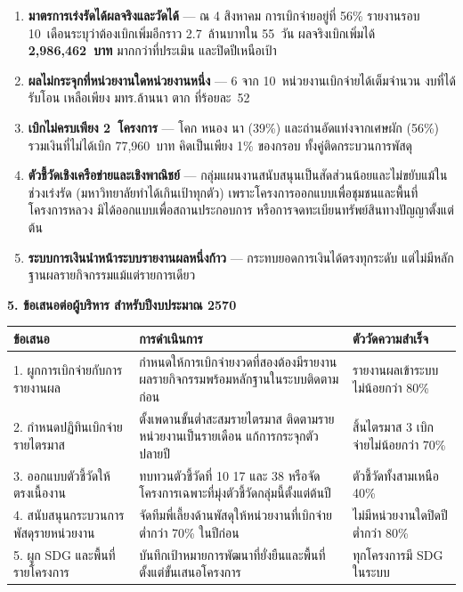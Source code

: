 \documentclass[11pt]{article}
\newcommand{\sechead}[1]{%
  \vspace{5pt}
  {\color{FirstBlue}\fontsize{13.5}{16}\selectfont\bfseries #1}%
  \par\vspace{-3pt}{\color{rpfgold}\rule{\linewidth}{1.2pt}}\par\vspace{2pt}}
\begin{document}
\begin{enumerate}[leftmargin=1.5em,itemsep=2pt,topsep=2pt]
  \item \textbf{มาตรการเร่งรัดได้ผลจริงและวัดได้} --- ณ 4 สิงหาคม การเบิกจ่ายอยู่ที่ 56\%
        รายงานรอบ 10~เดือนระบุว่าต้องเบิกเพิ่มอีกราว 2.7~ล้านบาทใน 55~วัน
        ผลจริงเบิกเพิ่มได้ \textbf{2,986,462~บาท} มากกว่าที่ประเมิน และปิดปีเหนือเป้า
  \item \textbf{ผลไม่กระจุกที่หน่วยงานใดหน่วยงานหนึ่ง} --- 6 จาก 10~หน่วยงานเบิกจ่ายได้เต็มจำนวน
        งบที่ได้รับโอน เหลือเพียง มทร.ล้านนา ตาก ที่ร้อยละ~52
  \item \textbf{เบิกไม่ครบเพียง 2~โครงการ} --- โคก หนอง นา (39\%) และถ่านอัดแท่งจากเศษผัก (56\%)
        รวมเงินที่ไม่ได้เบิก 77,960~บาท คิดเป็นเพียง 1\% ของกรอบ ทั้งคู่ติดกระบวนการพัสดุ
  \item \textbf{ตัวชี้วัดเชิงเครือข่ายและเชิงพาณิชย์} --- กลุ่มแผนงานสนับสนุนเป็นสัดส่วนน้อยและไม่ขยับแม้ในช่วงเร่งรัด
        (มหาวิทยาลัยทำได้เกินเป้าทุกตัว)
        เพราะโครงการออกแบบเพื่อชุมชนและพื้นที่โครงการหลวง มิได้ออกแบบเพื่อสถานประกอบการ
        หรือการจดทะเบียนทรัพย์สินทางปัญญาตั้งแต่ต้น
  \item \textbf{ระบบการเงินนำหน้าระบบรายงานผลหนึ่งก้าว} --- กระทบยอดการเงินได้ตรงทุกระดับ
        แต่ไม่มีหลักฐานผลรายกิจกรรมแม้แต่รายการเดียว
\end{enumerate}

\sechead{5. ข้อเสนอต่อผู้บริหาร สำหรับปีงบประมาณ 2570}

\small
\begin{tabular}{L{5.5cm}L{7.0cm}L{3.4cm}}
\toprule
{}
\textbf{ข้อเสนอ} & \textbf{การดำเนินการ} & \textbf{ตัววัดความสำเร็จ}\\
. ผูกการเบิกจ่ายกับการรายงานผล & กำหนดให้การเบิกจ่ายงวดที่สองต้องมีรายงานผลรายกิจกรรมพร้อมหลักฐานในระบบติดตามก่อน & รายงานผลเข้าระบบไม่น้อยกว่า 80\%\\
2. กำหนดปฏิทินเบิกจ่ายรายไตรมาส & ตั้งเพดานขั้นต่ำสะสมรายไตรมาส ติดตามรายหน่วยงานเป็นรายเดือน แก้การกระจุกตัวปลายปี & สิ้นไตรมาส 3 เบิกจ่ายไม่น้อยกว่า 70\%\\
3. ออกแบบตัวชี้วัดให้ตรงเนื้องาน & ทบทวนตัวชี้วัดที่ 10 17 และ 38 หรือจัดโครงการเฉพาะที่มุ่งตัวชี้วัดกลุ่มนี้ตั้งแต่ต้นปี & ตัวชี้วัดทั้งสามเหนือ 40\%\\
4. สนับสนุนกระบวนการพัสดุรายหน่วยงาน & จัดทีมพี่เลี้ยงด้านพัสดุให้หน่วยงานที่เบิกจ่ายต่ำกว่า 70\% ในปีก่อน & ไม่มีหน่วยงานใดปิดปีต่ำกว่า 80\%\\
5. ผูก SDG และพื้นที่รายโครงการ & บันทึกเป้าหมายการพัฒนาที่ยั่งยืนและพื้นที่ตั้งแต่ขั้นเสนอโครงการ & ทุกโครงการมี SDG ในระบบ\\
\bottomrule
\end{tabular}
\normalsize
\end{document}

